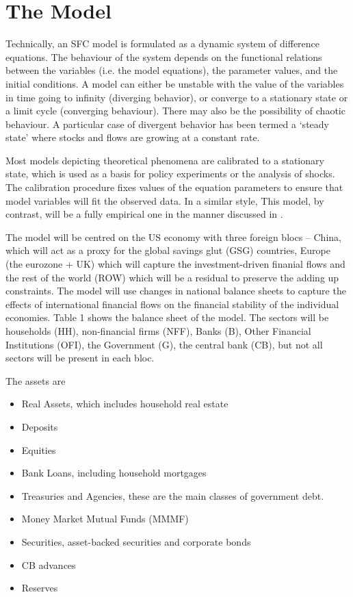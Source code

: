 \documentclass[twoside,a4paper,11pt]{article}
\begin{document}
\section{The Model}
Technically, an SFC model is formulated as a dynamic system of difference equations.
The behaviour of the system depends on the functional relations between the
variables (i.e. the model equations), the parameter values, and the initial conditions. A
model can either be unstable with the value of the variables in time going to infinity
(diverging behavior), or converge to a stationary state or a limit cycle (converging behaviour). There may also be the possibility of chaotic behaviour. A particular case of divergent behavior has been termed a `steady state' \cite[:p9]{Caverzasi2014a} where stocks and flows are growing at a constant rate.

Most models depicting theoretical phenomena are calibrated to a stationary state,
which is used as a basis for policy experiments or the analysis of shocks.  The calibration procedure fixes values of the equation parameters  to ensure that model variables will fit the observed data. In a similar style,  
This model, by contrast, will be a fully empirical one in the manner discussed in \cite{Kinsella2012b}.

The model will be centred on the US economy with  three foreign blocs -- China, which will act as a proxy for the global savings glut (GSG) countries, Europe (the eurozone + UK) which will capture the investment-driven finanial flows and the rest of the world (ROW) which will be a residual to preserve the adding up constraints. The model will use changes in national balance sheets to capture the effects of international financial flows on the financial stability of the individual economies. Table 1 shows the balance sheet of the model. The sectors will be households (HH), non-financial firms (NFF), Banks (B), Other Financial Institutions (OFI), the Government (G), the central bank (CB), but not all sectors will be present in each bloc.

The assets are 
\begin{itemize}
\item[] Real Assets, which includes household real estate
\item[] Deposits
\item[] Equities
\item[] Bank Loans, including household mortgages
\item[] Treasuries and Agencies, these are the main classes of government debt. 
\item[] Money Market Mutual Funds (MMMF)
\item[] Securities, asset-backed securities and corporate bonds
\item[] CB advances
\item[] Reserves
\end{itemize}
\end{document}
